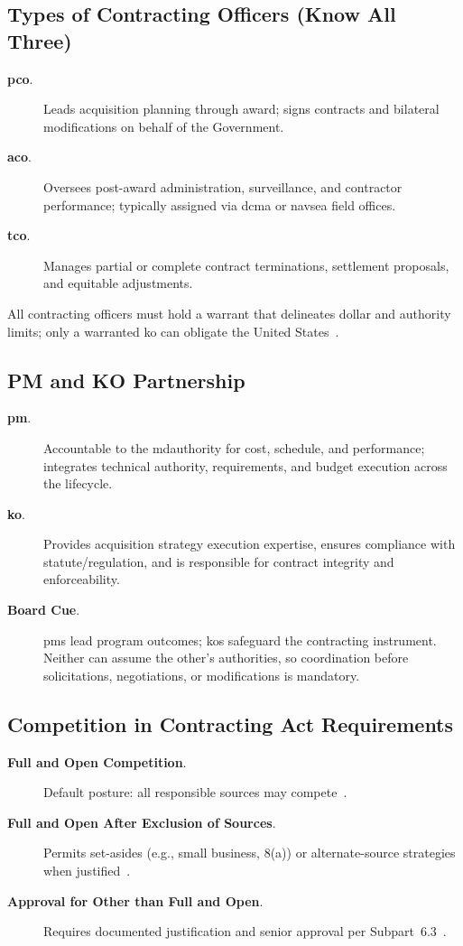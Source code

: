 \documentclass[../main.tex]{subfiles}
\begin{document}
\subsection{Types of Contracting Officers (Know All Three)}
\begin{description}
	\item[\textbf{\ac{pco}}.] Leads acquisition planning through award; signs contracts and bilateral modifications on behalf of the Government.
	\item[\textbf{\ac{aco}}.] Oversees post-award administration, surveillance, and contractor performance; typically assigned via \ac{dcma} or \ac{navsea} field offices.
	\item[\textbf{\ac{tco}}.] Manages partial or complete contract terminations, settlement proposals, and equitable adjustments.
\end{description}
All contracting officers must hold a warrant that delineates dollar and authority limits; only a warranted \ac{ko} can obligate the United States~\autocite{FAR}.

\subsection{PM and KO Partnership}
\begin{description}
	\item[\textbf{\ac{pm}}.] Accountable to the \ac{mdauthority} for cost, schedule, and performance; integrates technical authority, requirements, and budget execution across the lifecycle.
	\item[\textbf{\ac{ko}}.] Provides acquisition strategy execution expertise, ensures compliance with statute/regulation, and is responsible for contract integrity and enforceability.
	\item[\textbf{Board Cue}.] \acp{pm} lead program outcomes; \acp{ko} safeguard the contracting instrument. Neither can assume the other's authorities, so coordination before solicitations, negotiations, or modifications is mandatory.
\end{description}

\subsection{Competition in Contracting Act Requirements}
\begin{description}
	\item[\textbf{Full and Open Competition}.] Default posture: all responsible sources may compete~\autocite{USC-3201-CICA,FAR}.
	\item[\textbf{Full and Open After Exclusion of Sources}.] Permits set-asides (e.g., small business, 8(a)) or alternate-source strategies when justified~\autocite{FAR}.
	\item[\textbf{Approval for Other than Full and Open}.] Requires documented justification and senior approval per Subpart~6.3~\autocite[Subpart~6.3]{FAR}.
\end{description}
\end{document}
